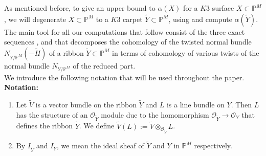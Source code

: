\documentclass[11pt,twoside]{amsart}
\theoremstyle{plain}
\numberwithin{equation}{section}
\newtheorem{theorem}{Theorem}[section]
\theoremstyle{definition}
\begin{document}
As mentioned before, to give an upper bound to $\alpha(X)$ for a $K3$ surface $X \subset \mathbb{P}^M$, we will degenerate $X \subset \mathbb{P}^M$ to a $K3$ carpet $\widetilde{Y} \subset \mathbb{P}^M$, using  and compute $\alpha(\widetilde{Y})$.  The main tool for all our computations that follow consist of the three exact sequences ,  and   that decomposes the cohomology of the twisted normal bundle $N_{\widetilde{Y}/\mathbb{P}^M}(-\widetilde{H})$ of a ribbon $\widetilde{Y} \subset \mathbb{P}^M$ in terms of cohomology of various twists of the normal bundle $N_{Y/\mathbb{P}^M}$ of the reduced part. \\
\color{blue}
\noindent We introduce the following notation that will be used throughout the paper. \\
\noindent \textbf{Notation:} 
\begin{enumerate} 
    \item[(a)]  Let $\widetilde{V}$ is a vector bundle on the ribbon $\widetilde{Y}$ and $L$ is a line bundle on $Y$. Then $L$ has the structure of an $\mathcal{O}_{\widetilde{Y}}$ module due to the homomorphism $\mathcal{O}_{\widetilde{Y}} \to \mathcal{O}_Y$ that defines the ribbon $\widetilde{Y}$.  We define $\widetilde{V}(L):=\widetilde{V}\otimes_{\mathcal{O}_{\widetilde{Y}}} L$.

    \item[(b)] By $I_{\widetilde{Y}}$ and $I_{Y}$, we mean the ideal sheaf of $\widetilde{Y}$ and $Y$ in $\mathbb{P}^M$ respectively.
\end{enumerate}

\color{black}



\end{document}
